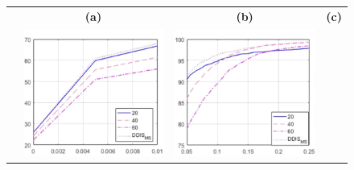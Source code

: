 \documentclass[10pt,twocolumn,letterpaper]{article}
\begin{document}
{\begin{figure}[htb]
	\centering
	\setlength\tabcolsep{0.5pt}
	\begin{tabular}{cccc}
		& \textbf{(a)} & \textbf{(b)} & \textbf{(c)}\\
		\rotatebox{90}{    \, \% Correspondences} &
		\includegraphics[scale=0.5]{figures/PieceSizeLow.png} &  
		\includegraphics[scale=0.5]{figures/PieceSizeMedium.png}&

\end{tabular}
\end{figure}}
\end{document}

